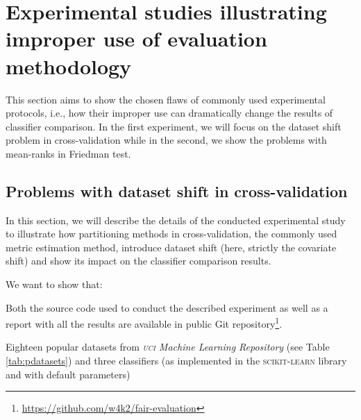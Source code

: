 \documentclass[final,3p,times,onecolumn]{elsarticle}
\begin{document}
\section{Experimental studies illustrating improper use of evaluation methodology}

This section aims to show the chosen flaws of commonly used experimental protocols,
i.e., how their improper use can dramatically change the results of classifier comparison.
In the first experiment, we will focus on the dataset shift problem in cross-validation while in the second, we show the problems with mean-ranks in Friedman test.


\subsection{Problems with dataset shift in cross-validation}

In this section, we will describe the details of the conducted experimental study to illustrate how partitioning methods in cross-validation, the commonly used metric estimation method, introduce dataset shift (here, strictly the covariate shift) and show its impact on the classifier comparison results.


We want to show that:

\begin{quote}
\end{quote}

Both the source code used to conduct the described experiment as well as a report with all the results are available in public Git repository\footnote{\url{https://github.com/w4k2/fair-evaluation}}. %

Eighteen popular datasets from \emph{\textsc{uci} Machine Learning Repository} (see Table \ref{tab:pdatasets}) \cite{Dua:2019} and three classifiers (as implemented in the \textsc{scikit-learn} library and with default parameters) %
\end{document}

